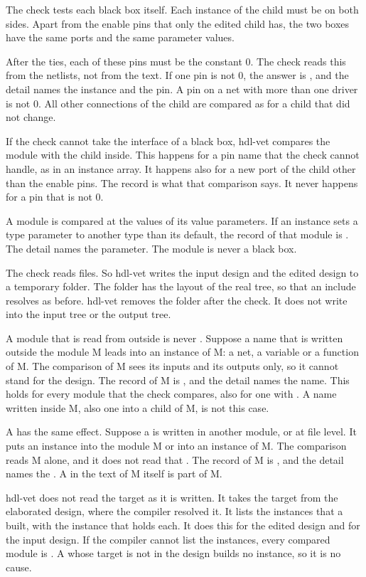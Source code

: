 The check tests each black box itself. Each instance of the child must be on both sides.
Apart from the enable pins that only the edited child has, the two boxes have the same ports
and the same parameter values.

After the ties, each of these pins must be the constant 0. The check reads this
from the netlists, not from the text. If one pin is not 0, the answer is , and
the detail names the instance and the pin. A pin on a net with more than one driver is not
0. All other connections of the child are compared as for a child that did not change.

If the check cannot take the interface of a black box, hdl-vet compares the module with the
child inside. This happens for a pin name that the check cannot handle, as in an instance
array. It happens also for a new port of the child other than the enable pins. The record is what that
comparison says. It never happens for a pin that is not 0.

A module is compared at the values of its value parameters. If an instance sets a type
parameter to another type than its default, the record of that module is . The
detail names the parameter. The module is never a black box.

The check reads files. So hdl-vet writes the input design and the edited design to a
temporary folder. The folder has the layout of the real tree, so that an include
resolves as before. hdl-vet removes the folder after the check. It does not write into the
input tree or the output tree.

A module that is read from outside is never . Suppose a name that is written
outside the module M leads into an instance of M: a net, a variable or a function of M. The
comparison of M sees its inputs and its outputs only, so it cannot stand for the design.
The record of M is , and the detail names the name. This holds for every module
that the check compares, also for one with . A name written inside M, also
one into a child of M, is not this case.

A  has the same effect. Suppose a  is written in another module, or at
file level. It puts an instance into the module M or into an instance of M. The comparison
reads M alone, and it does not read that . The record of M is , and
the detail names the . A  in the text of M itself is part of M.

hdl-vet does not read the target as it is written. It takes the target from the elaborated
design, where the compiler resolved it. It lists the instances that a  built, with
the instance that holds each. It does this for the edited design and for the input design.
If the compiler cannot list the instances, every compared module is . A
 whose target is not in the design builds no instance, so it is no cause.

